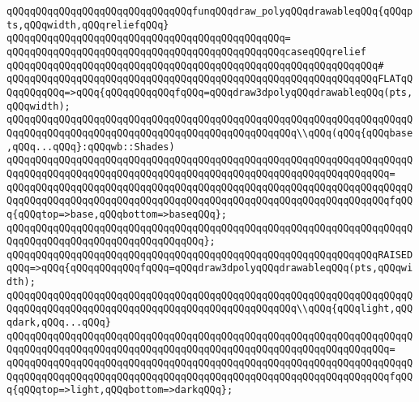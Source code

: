 \newline
\newline
\verb|qQQqqQQqqQQqqQQqqQQqqQQqqQQqqQQqfunqQQqdraw_polyqQQqdrawableqQQq{qQQqpts,qQQqwidth,qQQqreliefqQQq}|\newline
\verb|qQQqqQQqqQQqqQQqqQQqqQQqqQQqqQQqqQQqqQQqqQQqqQQq=|\newline
\verb|qQQqqQQqqQQqqQQqqQQqqQQqqQQqqQQqqQQqqQQqqQQqqQQqcaseqQQqrelief|\newline
\verb|qQQqqQQqqQQqqQQqqQQqqQQqqQQqqQQqqQQqqQQqqQQqqQQqqQQqqQQqqQQqqQQq#|\newline
\verb|qQQqqQQqqQQqqQQqqQQqqQQqqQQqqQQqqQQqqQQqqQQqqQQqqQQqqQQqqQQqqQQqFLATqQQqqQQqqQQq=>qQQq{qQQqqQQqqQQqfqQQq=qQQqdraw3dpolyqQQqdrawableqQQq(pts,qQQqwidth);|\newline
\newline
\verb|qQQqqQQqqQQqqQQqqQQqqQQqqQQqqQQqqQQqqQQqqQQqqQQqqQQqqQQqqQQqqQQqqQQqqQQqqQQqqQQqqQQqqQQqqQQqqQQqqQQqqQQqqQQqqQQqqQQqqQQq\\qQQq(qQQq{qQQqbase,qQQq...qQQq}:qQQqwb::Shades)|\newline
\verb|qQQqqQQqqQQqqQQqqQQqqQQqqQQqqQQqqQQqqQQqqQQqqQQqqQQqqQQqqQQqqQQqqQQqqQQqqQQqqQQqqQQqqQQqqQQqqQQqqQQqqQQqqQQqqQQqqQQqqQQqqQQqqQQqqQQqqQQq=|\newline
\verb|qQQqqQQqqQQqqQQqqQQqqQQqqQQqqQQqqQQqqQQqqQQqqQQqqQQqqQQqqQQqqQQqqQQqqQQqqQQqqQQqqQQqqQQqqQQqqQQqqQQqqQQqqQQqqQQqqQQqqQQqqQQqqQQqqQQqqQQqfqQQq{qQQqtop=>base,qQQqbottom=>baseqQQq};|\newline
\verb|qQQqqQQqqQQqqQQqqQQqqQQqqQQqqQQqqQQqqQQqqQQqqQQqqQQqqQQqqQQqqQQqqQQqqQQqqQQqqQQqqQQqqQQqqQQqqQQqqQQqqQQq};|\newline
\newline
\verb|qQQqqQQqqQQqqQQqqQQqqQQqqQQqqQQqqQQqqQQqqQQqqQQqqQQqqQQqqQQqqQQqRAISEDqQQq=>qQQq{qQQqqQQqqQQqfqQQq=qQQqdraw3dpolyqQQqdrawableqQQq(pts,qQQqwidth);|\newline
\newline
\verb|qQQqqQQqqQQqqQQqqQQqqQQqqQQqqQQqqQQqqQQqqQQqqQQqqQQqqQQqqQQqqQQqqQQqqQQqqQQqqQQqqQQqqQQqqQQqqQQqqQQqqQQqqQQqqQQqqQQqqQQq\\qQQq{qQQqlight,qQQqdark,qQQq...qQQq}|\newline
\verb|qQQqqQQqqQQqqQQqqQQqqQQqqQQqqQQqqQQqqQQqqQQqqQQqqQQqqQQqqQQqqQQqqQQqqQQqqQQqqQQqqQQqqQQqqQQqqQQqqQQqqQQqqQQqqQQqqQQqqQQqqQQqqQQqqQQqqQQq=|\newline
\verb|qQQqqQQqqQQqqQQqqQQqqQQqqQQqqQQqqQQqqQQqqQQqqQQqqQQqqQQqqQQqqQQqqQQqqQQqqQQqqQQqqQQqqQQqqQQqqQQqqQQqqQQqqQQqqQQqqQQqqQQqqQQqqQQqqQQqqQQqfqQQq{qQQqtop=>light,qQQqbottom=>darkqQQq};|\newline
